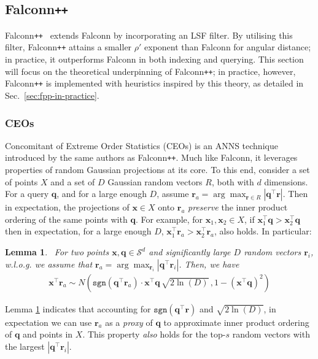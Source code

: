 \documentclass{article}
\newcommand{\bx}{\mathbf{x}}
\newcommand{\br}{\mathbf{r}}
\newcommand{\bq}{\mathbf{q}}
\newcommand{\fpp}{Falconn\texttt{++}\xspace}
\newcommand{\argmax}{\arg\max}
\newcommand{\sgn}{\texttt{sgn}}
\newcommand{\dotqr}{\bq^\top \br}
\newcommand{\dotxr}{\bx^\top \br}
\newtheorem{lemma}[theorem]{Lemma}
\begin{document}
\subsection{\fpp}

\fpp~\cite{pham2022falconn++} extends Falconn by incorporating an LSF filter. By utilising this filter, \fpp attains a smaller $\rho'$ exponent than Falconn for angular distance; in practice, it outperforms Falconn in both indexing and querying. This section will focus on the theoretical underpinning of \fpp; in practice, however, \fpp is implemented with heuristics inspired by this theory, as detailed in Sec.~\ref{sec:fpp-in-practice}.

\subsubsection{CEOs}
\label{sec:ceos}

Concomitant of Extreme Order Statistics (CEOs) is an ANNS technique introduced by the same authors as \fpp \cite{pham2021simple}. Much like Falconn, it leverages properties of random Gaussian projections at its core. To this end, consider a set of points $X$ and a set of $D$ Gaussian random vectors $R$, both with $d$ dimensions. For a query $\bq$, and for a large enough $D$, assume $\br_a = \argmax_{\br \in R}|\dotqr|$. Then in expectation, the projections of $\bx \in X$ onto $\br_a$ \emph{preserve} the inner product ordering of the same points with $\bq$. For example, for $\bx_1, \bx_2 \in X$, if $\bx_1^\top\bq > \bx_2^\top\bq$ then in expectation, for a large enough $D$, $\bx_1^\top\br_a > \bx_2^\top\br_a$,  also holds. In particular:

\begin{lemma}~\cite{pham2021simple}\label{lm:CEOs}
	For two points $\bx, \bq \in \mathcal{S}^d$ and significantly large $D$ random vectors $\br_i$, w.l.o.g. we assume that $\br_a = \argmax_{\br_i}{|\dotqr_i|}$. Then, we have
	\begin{align}\label{eq:CEOs}
	\dotxr_a \sim N \left( \mathtt{sgn}(\dotqr_a) \cdot \bx^\top\bq \,  \sqrt{2 \ln{(D)}} \, , 1 - (\bx^\top\bq)^2\right)
	\end{align}	
\end{lemma} 

Lemma \ref{lm:CEOs} indicates that accounting for $\sgn(\dotqr)$ and $\sqrt{2 \ln(D)}$, in expectation we can use $\br_a$ as a \emph{proxy} of $\bq$ to approximate inner product ordering of $\bq$ and points in $X$. This property \emph{also} holds for the top-$s$ random vectors with the largest $|\dotqr_i|$. 
\end{document}
